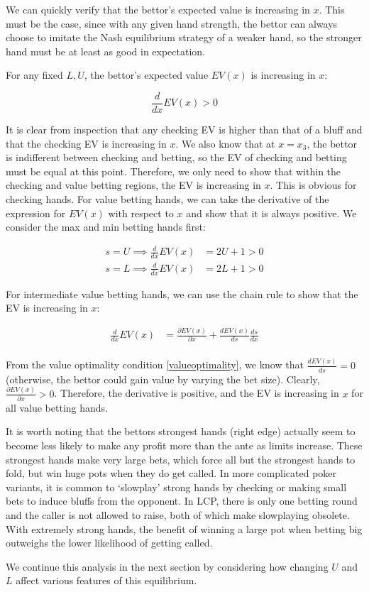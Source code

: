 \documentclass[../../main/main.tex]{subfiles}
\begin{document}
We can quickly verify that the bettor's expected value is increasing in $x$. This must be the case, since with any given hand strength, the bettor can always choose to imitate the Nash equilibrium strategy of a weaker hand, so the stronger hand must be at least as good in expectation.

\begin{theorem}
    \label{thm:ev_increasing}
    For any fixed $L, U$, the bettor's expected value $EV(x)$ is increasing in $x$:

    $$ \frac{d}{dx} EV(x) > 0 $$
\end{theorem}

\begin{customproof}
    It is clear from inspection that any checking EV is higher than that of a bluff and that the checking EV is increasing in $x$. We also know that at $x=x_3$, the bettor is indifferent between checking and betting, so the EV of checking and betting must be equal at this point. Therefore, we only need to show that within the checking and value betting regions, the EV is increasing in $x$. This is obvious for checking hands. For value betting hands, we can take the derivative of the expression for $EV(x)$ with respect to $x$ and show that it is always positive. We consider the max and min betting hands first:
    
    \begin{align*}
        s = U \implies \frac{d}{dx} EV(x) & = 2U + 1 > 0  \\
        s = L \implies \frac{d}{dx} EV(x) & = 2L + 1 > 0 
    \end{align*}
    
    For intermediate value betting hands, we can use the chain rule to show that the EV is increasing in $x$:
    
    \begin{align*}
        \frac{d}{dx} EV(x) & = \frac{\partial EV(x)}{\partial x} + \frac{dEV(x)}{ds} \frac{d s}{d x} \\
    \end{align*}

    From the value optimality condition \ref{valueoptimality}, we know that $\frac{dEV(x)}{ds} = 0$ (otherwise, the bettor could gain value by varying the bet size). Clearly, $\frac{\partial EV(x)}{\partial x} > 0$.  Therefore, the derivative is positive, and the EV is increasing in $x$ for all value betting hands.
\end{customproof}

It is worth noting that the bettors strongest hands (right edge) actually seem to become less likely to make any profit more than the ante as limits increase. These strongest hands make very large bets, which force all but the strongest hands to fold, but win huge pots when they do get called. In more complicated poker variants, it is common to `slowplay' strong hands by checking or making small bets to induce bluffs from the opponent. In LCP, there is only one betting round and the caller is not allowed to raise, both of which make slowplaying obsolete. With extremely strong hands, the benefit of winning a large pot when betting big outweighs the lower likelihood of getting called.

We continue this analysis in the next section by considering how changing $U$ and $L$ affect various features of this equilibrium.
\end{document}
